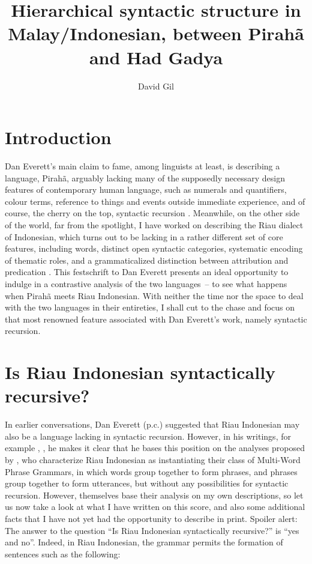 \documentclass[output=paper,colorlinks,citecolor=brown
]{langscibook}
\author{David Gil\affiliation{Max Planck Institute for Evolutionary Anthropology}}
\title[Hierarchical syntactic structure in Malay/Indonesian]{Hierarchical syntactic structure in Malay/Indonesian, between Pirahã and Had Gadya}
\begin{document}
\maketitle

\section{Introduction}
\begin{sloppypar}
Dan Everett's main claim to fame, among linguists at least, is describing a language, Pirahã, arguably lacking many of the supposedly necessary design features of contemporary human language, such as numerals and quantifiers, colour terms, reference to things and events outside immediate experience, and of course, the cherry on the top, syntactic recursion \citep{everett2005cultural}. Meanwhile, on the other side of the world, far from the spotlight, I have worked on describing the Riau dialect of Indonesian, which turns out to be lacking in a rather different set of core features, including words, distinct open syntactic categories, systematic encoding of thematic roles, and a grammaticalized distinction between attribution and predication \citep{gil2005word,gil2006intonation,gil2012predication,gil2013riau, gil2017isolating, gil2020isolating}. This festschrift to Dan Everett presents an ideal opportunity to indulge in a contrastive analysis of the two languages~– to see what happens when Pirahã meets Riau Indonesian. With neither the time nor the space to deal with the two languages in their entireties, I shall cut to the chase and focus on that most renowned feature associated with Dan Everett's work, namely syntactic recursion.
\end{sloppypar}

\section{Is Riau Indonesian syntactically recursive?}

In earlier conversations, Dan Everett (p.c.) suggested that Riau Indonesian may also be a language lacking in syntactic recursion. However, in his writings, for example \citet{futrell2016corpus}, \citet{everett2017grammar}, he makes it clear that he bases this position on the analyses proposed by \citet{jackendoff2014syntax, jackendoff2017linear}, who characterize Riau Indonesian as instantiating their class of Multi-Word Phrase Grammars, in which words group together to form phrases, and phrases group together to form utterances, but without any possibilities for syntactic recursion. However, \citet{jackendoff2014syntax, jackendoff2017linear} themselves base their analysis on my own descriptions, so let us now take a look at what I have written on this score, and also some additional facts that I have not yet had the opportunity to describe in print. Spoiler alert: The answer to the question ``Is Riau Indonesian syntactically recursive?'' is ``yes and no''.
Indeed, in Riau Indonesian, the grammar permits the formation of sentences such as the following:
\end{document}
